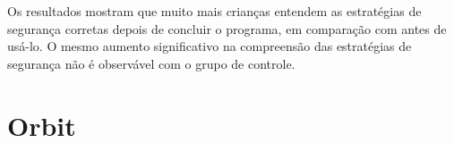 Os resultados mostram que muito mais crianças entendem as estratégias de segurança corretas depois de concluir o programa, em comparação com antes de usá-lo. O mesmo aumento significativo na compreensão das estratégias de segurança não é observável com o grupo de controle. %











\section{Orbit}\label{sssec:Orbit}


